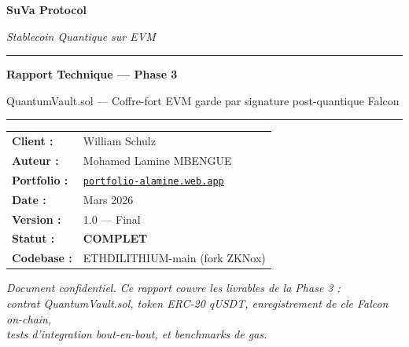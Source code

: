 \documentclass[11pt,a4paper]{article}
\begin{document}

\begin{titlepage}
\centering
\vspace*{2cm}
{\Huge\bfseries\textcolor{suva-blue}{SuVa Protocol}\par}
\vspace{0.5cm}
{\Large\textit{Stablecoin Quantique sur EVM}\par}
\vspace{1.5cm}
\rule{\linewidth}{0.5pt}
\vspace{0.5cm}
{\LARGE\bfseries Rapport Technique --- Phase 3\par}
\vspace{0.3cm}
{\large QuantumVault.sol --- Coffre-fort EVM garde par signature post-quantique Falcon\par}
\vspace{0.5cm}
\rule{\linewidth}{0.5pt}
\vspace{2cm}

\begin{tabular}{ll}
\textbf{Client :}    & William Schulz \\[4pt]
\textbf{Auteur :}    & Mohamed Lamine MBENGUE \\[4pt]
\textbf{Portfolio :} & \href{https://portfolio-alamine.web.app}{\texttt{portfolio-alamine.web.app}} \\[4pt]
\textbf{Date :}      & Mars 2026 \\[4pt]
\textbf{Version :}   & 1.0 --- Final \\[4pt]
\textbf{Statut :}    & \textcolor{pass-green}{\textbf{COMPLET}} \\[4pt]
\textbf{Codebase :}  & ETHDILITHIUM-main (fork ZKNox) \\
\end{tabular}

\vfill
\begin{tcolorbox}[enhanced,colback=suva-blue!8,colframe=suva-blue,arc=4mm]
\centering\textit{Document confidentiel. Ce rapport couvre les livrables de la Phase 3 :\\
contrat QuantumVault.sol, token ERC-20 qUSDT, enregistrement de cle Falcon on-chain,\\
tests d'integration bout-en-bout, et benchmarks de gas.}
\end{tcolorbox}
\end{titlepage}

\tableofcontents
\newpage

\end{document}
